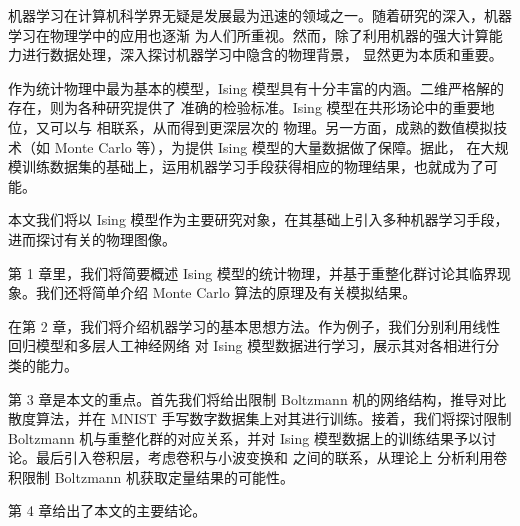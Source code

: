 机器学习在计算机科学界无疑是发展最为迅速的领域之一。随着研究的深入，机器学习在物理学中的应用也逐渐
为人们所重视。然而，除了利用机器的强大计算能力进行数据处理，深入探讨机器学习中隐含的物理背景，
显然更为本质和重要。

作为统计物理中最为基本的模型，Ising 模型具有十分丰富的内涵。二维严格解的存在，则为各种研究提供了
准确的检验标准。Ising 模型在共形场论中的重要地位，又可以与 \AdSCFT{} 相联系，从而得到更深层次的
物理。另一方面，成熟的数值模拟技术（如 Monte Carlo 等），为提供 Ising 模型的大量数据做了保障。据此，
在大规模训练数据集的基础上，运用机器学习手段获得相应的物理结果，也就成为了可能。

本文我们将以 Ising 模型作为主要研究对象，在其基础上引入多种机器学习手段，进而探讨有关的物理图像。

第 1 章里，我们将简要概述 Ising 模型的统计物理，并基于重整化群讨论其临界现象。我们还将简单介绍
Monte Carlo 算法的原理及有关模拟结果。

在第 2 章，我们将介绍机器学习的基本思想方法。作为例子，我们分别利用线性回归模型和多层人工神经网络
对 Ising 模型数据进行学习，展示其对各相进行分类的能力。

第 3 章是本文的重点。首先我们将给出限制 Boltzmann 机的网络结构，推导对比散度算法，并在 MNIST
手写数字数据集上对其进行训练。接着，我们将探讨限制 Boltzmann 机与重整化群的对应关系，并对 Ising
模型数据上的训练结果予以讨论。最后引入卷积层，考虑卷积与小波变换和 \AdSCFT{} 之间的联系，从理论上
分析利用卷积限制 Boltzmann 机获取定量结果的可能性。

第 4 章给出了本文的主要结论。
